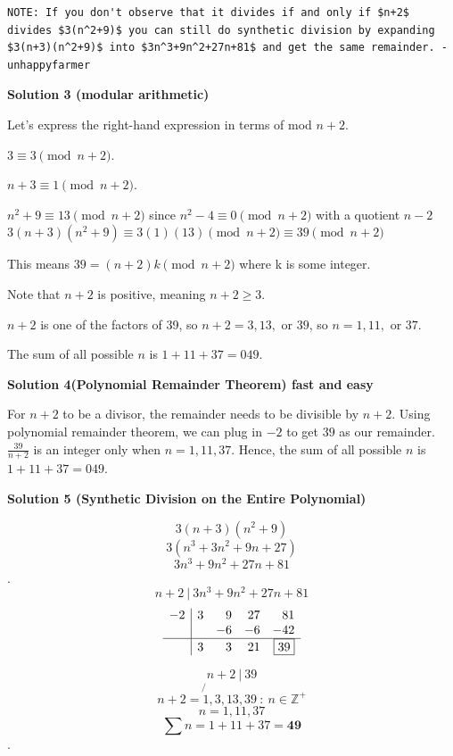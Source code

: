 \begin{enumerate}
 \begin{verbatim}
NOTE: If you don't observe that it divides if and only if $n+2$ divides $3(n^2+9)$ you can still do synthetic division by expanding $3(n+3)(n^2+9)$ into $3n^3+9n^2+27n+81$ and get the same remainder. -unhappyfarmer
\end{verbatim}





\textbf{Solution 3 (modular arithmetic)}

Let's express the right-hand expression in terms of mod $n + 2$.

 $3 \equiv 3 \pmod{n + 2}$.

 $n + 3 \equiv 1 \pmod{n + 2}$.

 $n^2 + 9 \equiv 13 \pmod{n + 2}$ since $n^2 - 4 \equiv 0 \pmod{n + 2}$ with a quotient $n - 2$
$3(n + 3)(n^2 + 9) \equiv 3(1)(13) \pmod{n + 2} \equiv 39 \pmod{n + 2}$

 This means $39 = (n + 2)k \pmod{n + 2}$ where k is some integer.

 Note that $n + 2$ is positive, meaning $n + 2 \geq 3$.

 $n + 2$ is one of the factors of 39, so $n + 2 = 3, 13,$ or $39$, so $n = 1, 11,$ or $37$.

 The sum of all possible $n$ is $1 + 11 + 37 = \boxed{049}$.

 



\textbf{Solution 4(Polynomial Remainder Theorem) fast and easy}

For $n+2$ to be a divisor, the remainder needs to be divisible by $n+2$. Using polynomial remainder theorem, we can plug in $-2$ to get $39$ as our remainder. $\frac{39}{n+2}$ is an integer only when $n = 1, 11, 37$. Hence, the sum of all possible $n$ is $1 + 11 + 37 = \boxed{049}$.

 



\textbf{Solution 5 (Synthetic Division on the Entire Polynomial)}


 \[3(n+3)(n^2+9)\]
 \[3(n^3 +3n^2 +9n + 27)\]
 \[3n^3 + 9n^2 + 27n + 81\].
 \[n+2 \ | \ 3n^3 + 9n^2 + 27n + 81\]
 \[\begin{array}{r|rrrr} -2 & 3 & 9 & 27 & 81 \\    &   & -6 & -6 & -42 \\ \hline    & 3 & 3 & 21 & \boxed{39} \end{array}\]

 \[n+2 \ | \ 39\]
 \[n + 2 = \not{1}, 3, 13, 39 \ : \ n \in \mathbb{Z}^+\]
 \[n = 1, 11, 37\]
 \[\sum n = 1+11+37 = \boxed{\mathbf{49}}\].


\end{enumerate}

